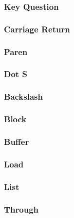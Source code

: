\subsubsection{Key Question}
\subsubsection{Carriage Return}
\subsubsection{Paren}
\subsubsection{Dot S}
\subsubsection{Backslash}
\subsubsection{Block}
\subsubsection{Buffer}
\subsubsection{Load}
\subsubsection{List}
\subsubsection{Through}

